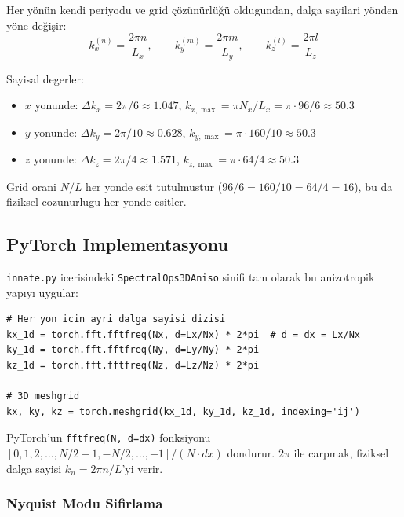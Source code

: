 Her yönün kendi periyodu ve grid çözünürlüğü oldugundan, dalga sayilari yönden yöne değişir:
\begin{equation}
k_x^{(n)} = \frac{2\pi n}{L_x}, \qquad
k_y^{(m)} = \frac{2\pi m}{L_y}, \qquad
k_z^{(l)} = \frac{2\pi l}{L_z}
\label{eq:aniso_wavenumbers}
\end{equation}

\begin{example}
Sayisal degerler:
\begin{itemize}
\item $x$ yonunde: $\Delta k_x = 2\pi/6 \approx 1.047$, \quad $k_{x,\max} = \pi N_x/L_x = \pi\cdot96/6 \approx 50.3$
\item $y$ yonunde: $\Delta k_y = 2\pi/10 \approx 0.628$, \quad $k_{y,\max} = \pi\cdot160/10 \approx 50.3$
\item $z$ yonunde: $\Delta k_z = 2\pi/4 \approx 1.571$, \quad $k_{z,\max} = \pi\cdot64/4 \approx 50.3$
\end{itemize}

Grid orani $N/L$ her yonde esit tutulmustur ($96/6 = 160/10 = 64/4 = 16$), bu da fiziksel cozunurlugu her yonde esitler.
\end{example}

\subsection{PyTorch Implementasyonu}

\texttt{innate.py} icerisindeki \texttt{SpectralOps3DAniso} sinifi tam olarak bu anizotropik yapıyı uygular:

\begin{lstlisting}[caption={SpectralOps3DAniso dalga sayisi hesabi},label={lst:aniso_wavenumbers}]
# Her yon icin ayri dalga sayisi dizisi
kx_1d = torch.fft.fftfreq(Nx, d=Lx/Nx) * 2*pi  # d = dx = Lx/Nx
ky_1d = torch.fft.fftfreq(Ny, d=Ly/Ny) * 2*pi
kz_1d = torch.fft.fftfreq(Nz, d=Lz/Nz) * 2*pi

# 3D meshgrid
kx, ky, kz = torch.meshgrid(kx_1d, ky_1d, kz_1d, indexing='ij')
\end{lstlisting}

\begin{remark}
PyTorch'un \texttt{fftfreq(N, d=dx)} fonksiyonu $[0, 1, 2, \ldots, N/2-1, -N/2, \ldots, -1] / (N \cdot dx)$ dondurur. $2\pi$ ile carpmak, fiziksel dalga sayisi $k_n = 2\pi n/L$'yi verir.
\end{remark}

\subsubsection{Nyquist Modu Sifirlama}

